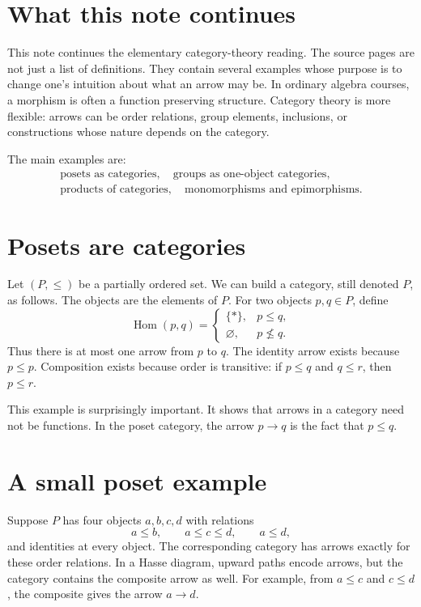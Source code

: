 
\section{What this note continues}

This note continues the elementary category-theory reading.  The source pages are not just a list of definitions.  They contain several examples whose purpose is to change one's intuition about what an arrow may be.  In ordinary algebra courses, a morphism is often a function preserving structure.  Category theory is more flexible: arrows can be order relations, group elements, inclusions, or constructions whose nature depends on the category.

The main examples are:
\[
\begin{gathered}
  \text{posets as categories},\quad
  \text{groups as one-object categories},\\
  \text{products of categories},\quad
  \text{monomorphisms and epimorphisms}.
\end{gathered}
\]

\section{Posets are categories}

Let $(P,\le)$ be a partially ordered set.  We can build a category, still denoted $P$, as follows.  The objects are the elements of $P$.  For two objects $p,q\in P$, define
\[
  \operatorname{Hom}(p,q)=
  \begin{cases}
  \{*\},&p\le q,\\
  \varnothing,&p\not\le q.
  \end{cases}
\]
Thus there is at most one arrow from $p$ to $q$.  The identity arrow exists because $p\le p$.  Composition exists because order is transitive: if $p\le q$ and $q\le r$, then $p\le r$.

This example is surprisingly important.  It shows that arrows in a category need not be functions.  In the poset category, the arrow $p\to q$ is the fact that $p\le q$.

\section{A small poset example}

Suppose $P$ has four objects $a,b,c,d$ with relations
\[
  a\le b,\qquad a\le c\le d,\qquad a\le d,
\]
and identities at every object.  The corresponding category has arrows exactly for these order relations.  In a Hasse diagram, upward paths encode arrows, but the category contains the composite arrow as well.  For example, from $a\le c$ and $c\le d$, the composite gives the arrow $a\to d$.

